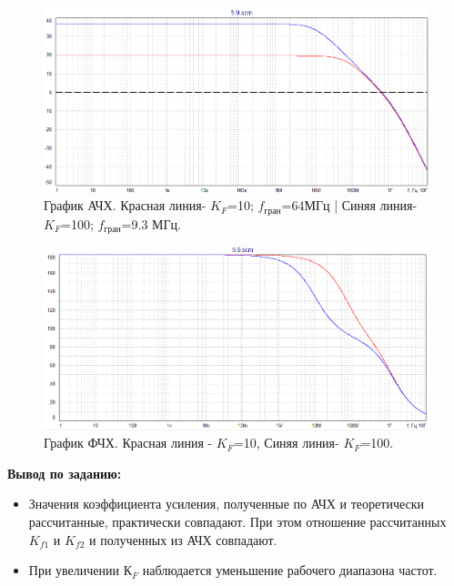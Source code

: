 \documentclass[a4paper,14pt]{extarticle}
\begin{document}
    \begin{figure}[h!]
        \captionsetup{justification=centering}
        \begin{center}
            \includegraphics[scale=0.6]{7.png}
        \end{center}
        \caption{График АЧХ. Красная линия- $K_F$=10; $f_\text{гран}$=64МГц | Синяя линия- $K_F$=100; $f_\text{гран}$=9.3 МГц.}
    \end{figure}

    \begin{figure}[h!]
        \begin{center}
            \includegraphics[scale=0.6]{8.png}
        \end{center}
        \caption{График ФЧХ. Красная линия - $K_F$=10, Синяя линия- $K_F$=100.}
    \end{figure}

    \textbf{Вывод по заданию:}

    \begin{itemize}
        \item Значения коэффициента усиления, полученные по АЧХ и теоретически рассчитанные, практически совпадают.
    При этом отношение рассчитанных $K_{f1}$ и $K_{f2}$ и полученных из АЧХ совпадают.
        \item При увеличении $К_F$ наблюдается уменьшение рабочего диапазона частот.
    \end{itemize}
\end{document}
